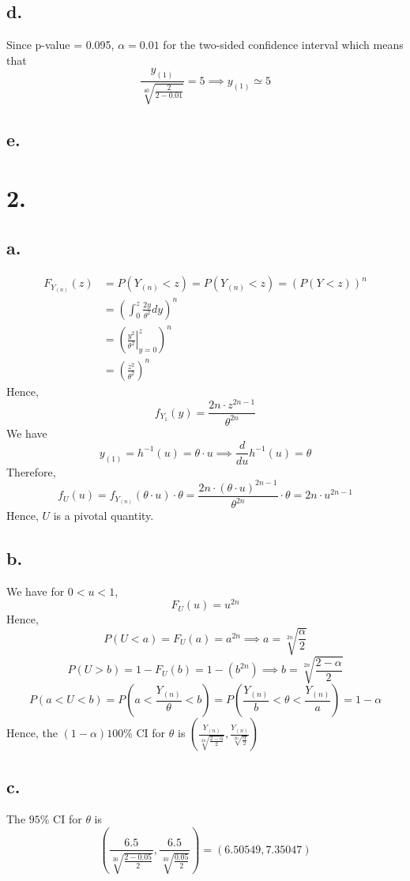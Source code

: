 \documentclass[11pt]{article}
\begin{document}
\subsection*{d.}
Since p-value = 0.095, $\alpha = 0.01$ for the two-sided confidence interval which means that 
\[
    \frac{y_{(1)}}{\sqrt[40]{\frac{2}{2-0.01}}} = 5  \implies y_{(1)} \simeq 5
\]
\subsection*{e.}
\pagebreak
\section*{2.}
\subsection*{a.}
\begin{equation*}
    \begin{aligned}
        F_{Y_{(n)}}(z) &= P(Y_{(n)} < z) = P(Y_{(n)} < z) = \left(P(Y < z)\right)^n \\
        &= \left( \int_0^z \frac{2y}{\theta^2} dy \right)^n \\
        &= \left( \left. \frac{y^2}{\theta^2} \right|_{y=0}^z \right)^n \\
        &= \left(\frac{z^2}{\theta^2} \right)^n
    \end{aligned}
\end{equation*}
Hence, 
\[
    f_{Y_{1}}(y) = \frac{2n \cdot z^{2n-1}}{\theta^{2n}}
\]
We have 
\[
    y_{(1)} =h^{-1}(u) = \theta \cdot u \implies \frac{d}{du}h^{-1}(u) = \theta
\]
Therefore, 
\[
    f_U(u) = f_{Y_{(n)}}(\theta \cdot u) \cdot \theta = \frac{2n \cdot (\theta \cdot u)^{2n-1}}{\theta^{2n}} \cdot \theta = 2n \cdot u^{2n-1}
\]
Hence, $U$ is a pivotal quantity.
\subsection*{b.}
We have for $0<u<1$,
\[
    F_U(u) = u^{2n}  
\]
Hence, 
\[
    P(U < a) = F_U(a) =  a^{2n} \implies a = \sqrt[2n]{\frac{\alpha}{2}} 
\]
\[
    P(U > b) = 1 - F_U(b) = 1 - \left(b^{2n}\right) \implies b = \sqrt[2n]{\frac{2-\alpha}{2}}   
\]
\[
    P(a<U<b) = P\left(a < \frac{Y_{(n)}}{\theta} < b\right) = P\left(\frac{Y_{(n)}}{b} < \theta < \frac{Y_{(n)}}{a} \right) = 1- \alpha    
\]
Hence, the $(1-\alpha)100\%$ CI for $\theta$ is $\left(\frac{Y_{(n)}}{\sqrt[2n]{\frac{2-\alpha}{2}}}, \frac{Y_{(n)}}{\sqrt[2n]{\frac{\alpha}{2}}}\right)$
\subsection*{c.}
The $95\%$ CI for $\theta$ is 
\[
    \left(\frac{6.5}{\sqrt[30]{\frac{2-0.05}{2}}}, \frac{6.5}{\sqrt[30]{\frac{0.05}{2}}}\right) = (6.50549, 7.35047)
\]
\end{document}
